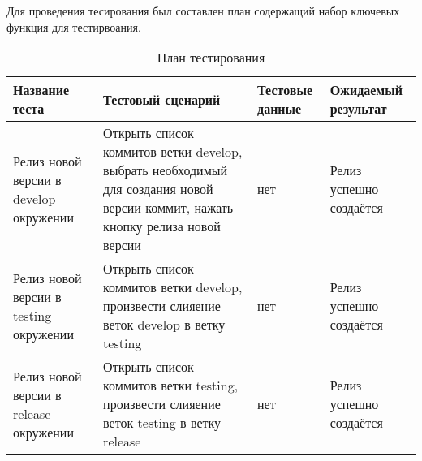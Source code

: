 Для проведения тесирования был составлен план содержащий набор ключевых функция для тестирвоания.
\begin{center}
    \begin{longtable}{|p{}|p{}|p{}|p{}|}
        \caption{План тестирования}
        \label{tab:testing-plan}
        \hline
        Название теста & Тестовый сценарий & Тестовые данные & Ожидаемый результат \\
        \hline
        Релиз новой версии в develop окружении & Открыть список коммитов ветки develop, выбрать необходимый для создания новой версии коммит, нажать кнопку релиза новой версии  & нет & Релиз успешно создаётся \\
        \hline
        Релиз новой версии в testing окружении & Открыть список коммитов ветки develop, произвести слияение веток develop в ветку testing  & нет & Релиз успешно создаётся \\
        \hline
        Релиз новой версии в release окружении & Открыть список коммитов ветки testing, произвести слияение веток testing в ветку release  & нет & Релиз успешно создаётся \\
        \hline
    \end{longtable}
\end{center}

